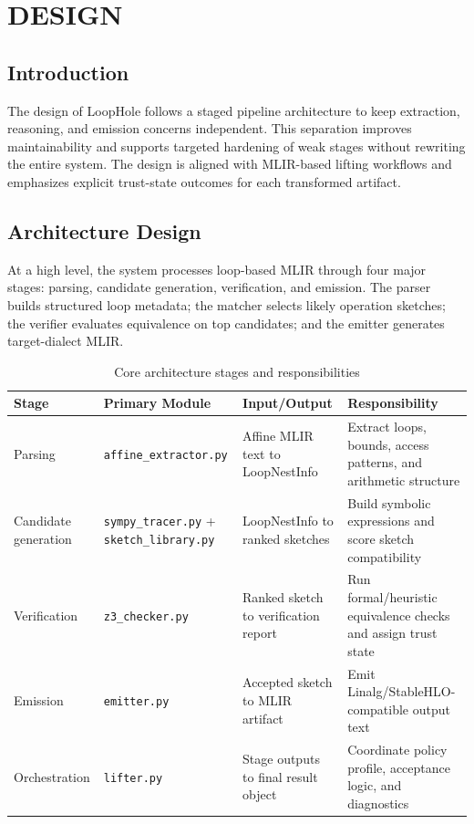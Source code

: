 \chapter{DESIGN}
\section{Introduction}
The design of LoopHole follows a staged pipeline architecture to keep extraction, reasoning, and emission concerns independent. This separation improves maintainability and supports targeted hardening of weak stages without rewriting the entire system. The design is aligned with MLIR-based lifting workflows and emphasizes explicit trust-state outcomes for each transformed artifact.

\section{Architecture Design}
At a high level, the system processes loop-based MLIR through four major stages: parsing, candidate generation, verification, and emission. The parser builds structured loop metadata; the matcher selects likely operation sketches; the verifier evaluates equivalence on top candidates; and the emitter generates target-dialect MLIR.

\begin{table}[H]
\centering
\caption{Core architecture stages and responsibilities}
\begin{tabular}{|p{2.8cm}|p{3.6cm}|p{3.7cm}|p{5.1cm}|}
\hline
\textbf{Stage} & \textbf{Primary Module} & \textbf{Input/Output} & \textbf{Responsibility} \\
\hline
Parsing & \texttt{affine\_extractor.py} & Affine MLIR text to LoopNestInfo & Extract loops, bounds, access patterns, and arithmetic structure \\
\hline
Candidate generation & \texttt{sympy\_tracer.py} + \texttt{sketch\_library.py} & LoopNestInfo to ranked sketches & Build symbolic expressions and score sketch compatibility \\
\hline
Verification & \texttt{z3\_checker.py} & Ranked sketch to verification report & Run formal/heuristic equivalence checks and assign trust state \\
\hline
Emission & \texttt{emitter.py} & Accepted sketch to MLIR artifact & Emit Linalg/StableHLO-compatible output text \\
\hline
Orchestration & \texttt{lifter.py} & Stage outputs to final result object & Coordinate policy profile, acceptance logic, and diagnostics \\
\hline
\end{tabular}
\end{table}

